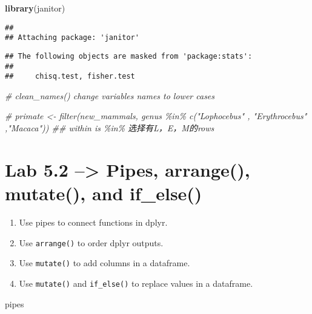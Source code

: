 \documentclass[
]{article}
\newenvironment{Shaded}{\begin{snugshade}}{\end{snugshade}}
\newcommand{\CommentTok}[1]{\textcolor[rgb]{0.56,0.35,0.01}{\textit{#1}}}
\newcommand{\FunctionTok}[1]{\textcolor[rgb]{0.13,0.29,0.53}{\textbf{#1}}}
\newcommand{\NormalTok}[1]{#1}
\providecommand{\tightlist}{%
  \setlength{\itemsep}{0pt}\setlength{\parskip}{0pt}}
\begin{document}
\begin{Shaded}
\begin{Highlighting}[]
\FunctionTok{library}\NormalTok{(janitor)}
\end{Highlighting}
\end{Shaded}

\begin{verbatim}
## 
## Attaching package: 'janitor'
\end{verbatim}

\begin{verbatim}
## The following objects are masked from 'package:stats':
## 
##     chisq.test, fisher.test
\end{verbatim}

\begin{Shaded}
\begin{Highlighting}[]
\CommentTok{\# clean\_names() change variables\textquotesingle{} names to lower cases}

\CommentTok{\# primate \textless{}{-} filter(new\_mammals, genus \%in\% c("Lophocebus" , "Erythrocebus"  ,"Macaca")) \#\# within is \%in\% 选择有L，E，M的rows}
\end{Highlighting}
\end{Shaded}

\hypertarget{lab-5.2-pipes-arrange-mutate-and-if_else}{%
\section{Lab 5.2 --\textgreater{} Pipes, arrange(), mutate(), and
if\_else()}\label{lab-5.2-pipes-arrange-mutate-and-if_else}}

\begin{enumerate}
\def\labelenumi{\arabic{enumi}.}
\tightlist
\item
  Use pipes to connect functions in dplyr.\\
\item
  Use \texttt{arrange()} to order dplyr outputs.\\
\item
  Use \texttt{mutate()} to add columns in a dataframe.\\
\item
  Use \texttt{mutate()} and \texttt{if\_else()} to replace values in a
  dataframe.
\end{enumerate}

pipes
\end{document}
